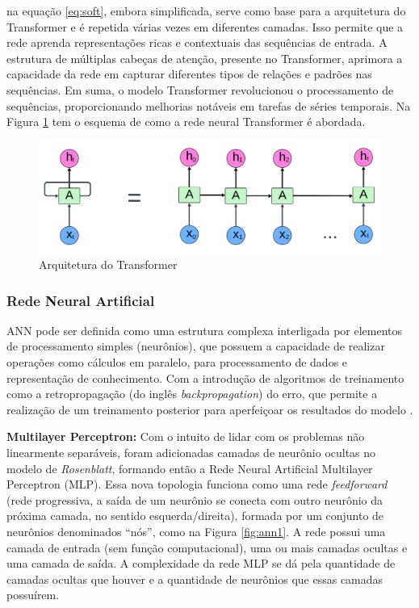 \noindent na equação \eqref{eq:soft}, embora simplificada, serve como base para a arquitetura do Transformer e é repetida várias vezes em diferentes camadas. Isso permite que a rede aprenda representações ricas e contextuais das sequências de entrada. A estrutura de múltiplas cabeças de atenção, presente no Transformer, aprimora a capacidade da rede em capturar diferentes tipos de relações e padrões nas sequências. Em suma, o modelo Transformer revolucionou o processamento de sequências, proporcionando melhorias notáveis em tarefas de séries temporais. Na Figura \ref{fig:transformer} tem o esquema de como a rede neural Transformer é abordada.

\begin{figure}[!htb]
	\centering
	\caption{Arquitetura do Transformer}
	\label{fig:transformer}
	\includegraphics[width=0.7\linewidth]{Apendices/Figuras/modelagem-24h/Transformer}
	
\end{figure}

\subsubsection{Rede Neural Artificial}

ANN pode ser definida como uma estrutura complexa interligada por elementos de processamento simples (neurônios), que possuem a capacidade de realizar operações como cálculos em paralelo, para processamento de dados e representação de conhecimento. Com a introdução de algoritmos de treinamento como a retropropagação (do inglês \textit{backpropagation}) do erro, que permite a realização de um treinamento posterior para aperfeiçoar os resultados do modelo \cite{Grubler2018}.

\noindent\textbf{Multilayer Perceptron:}
Com o intuito de lidar com os problemas não linearmente separáveis, foram adicionadas camadas de neurônio ocultas no modelo de \textit{Rosenblatt}, formando então a Rede Neural Artificial Multilayer Perceptron (MLP).
Essa nova topologia funciona como uma rede \textit{feedforward} (rede progressiva, a saída de um neurônio se conecta com outro neurônio da próxima camada, no sentido esquerda/direita), formada por um conjunto de neurônios denominados ``nós'', como  na Figura \ref{fig:ann1}. A rede possui uma camada de entrada (sem função computacional), uma ou mais camadas ocultas e uma camada de saída. A complexidade da rede MLP se dá pela quantidade de camadas ocultas que houver e a quantidade de neurônios que essas camadas possuírem.

